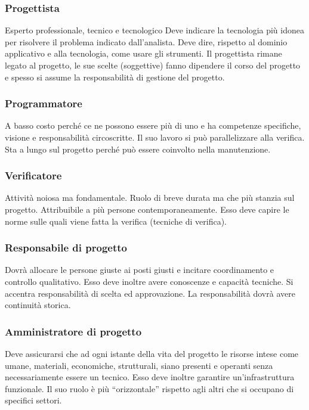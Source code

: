 \subsubsection{Progettista}
Esperto professionale, tecnico e tecnologico Deve indicare la tecnologia più idonea per risolvere il problema indicato dall'analista. Deve dire, rispetto al dominio applicativo e alla tecnologia, come usare gli strumenti. Il progettista rimane legato al progetto, le sue scelte (soggettive) fanno dipendere il corso del progetto e spesso si assume la responsabilità di gestione del progetto.

\subsubsection{Programmatore}
A basso costo perché ce ne possono essere più di uno e ha competenze specifiche, visione e responsabilità circoscritte. Il suo lavoro si può parallelizzare alla verifica. Sta a lungo sul progetto perché può essere coinvolto nella manutenzione.

\subsubsection{Verificatore}
Attività noiosa ma fondamentale. Ruolo di breve durata ma che più stanzia sul progetto. Attribuibile a più persone contemporaneamente. Esso deve capire le norme sulle quali viene fatta la verifica (tecniche di verifica).

\subsubsection{Responsabile di progetto}
Dovrà allocare le persone giuste ai posti giusti e incitare coordinamento e controllo qualitativo. Esso deve inoltre avere conoscenze e capacità tecniche. Si accentra responsabilità di scelta ed approvazione. La responsabilità dovrà avere continuità storica.

\subsubsection{Amministratore di progetto}
Deve assicurarsi che ad ogni istante della vita del progetto le risorse intese come umane, materiali, economiche, strutturali, siano presenti e operanti senza necessariamente essere un tecnico. 
Esso deve inoltre garantire un'infrastruttura funzionale. Il suo ruolo è più ``orizzontale'' rispetto agli altri che si occupano di specifici settori.

